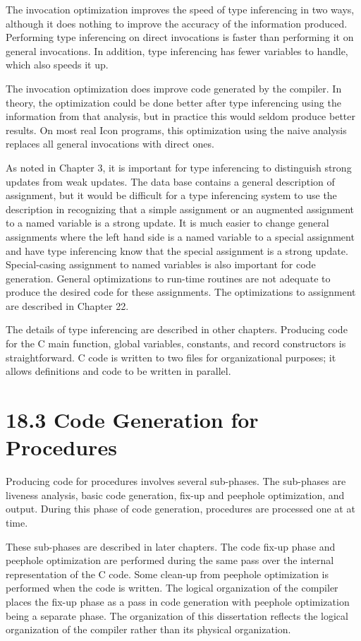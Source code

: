 The invocation optimization improves the speed of type inferencing in
two ways, although it does nothing to improve the accuracy of the
information produced. Performing type inferencing on direct
invocations is faster than performing it on general invocations. In
addition, type inferencing has fewer variables to handle, which also
speeds it up.

The invocation optimization does improve code generated by the
compiler. In theory, the optimization could be done better after type
inferencing using the information from that analysis, but in practice
this would seldom produce better results. On most real Icon programs,
this optimization using the naive analysis replaces all general
invocations with direct ones.

As noted in Chapter 3, it is important for type inferencing to
distinguish strong updates from weak updates. The data base contains a
general description of assignment, but it would be difficult for a
type inferencing system to use the description in recognizing that a
simple assignment or an augmented assignment to a named variable is a
strong update.  It is much easier to change general assignments where
the left hand side is a named variable to a special assignment and
have type inferencing know that the special assignment is a strong
update. Special-casing assignment to named variables is also important
for code generation. General optimizations to run-time routines are
not adequate to produce the desired code for these assignments. The
optimizations to assignment are described in Chapter 22.

The details of type inferencing are described in other
chapters. Producing code for the C main function, global variables,
constants, and record constructors is straightforward. C code is
written to two files for organizational purposes; it allows
definitions and code to be written in parallel.


\section[18.3 Code Generation for Procedures]{18.3 Code Generation for Procedures}

Producing code for procedures involves several sub-phases. The
sub-phases are liveness analysis, basic code generation, fix-up and
peephole optimization, and output. During this phase of code
generation, procedures are processed one at at time.

These sub-phases are described in later chapters. The code fix-up
phase and peephole optimization are performed during the same pass
over the internal representation of the C code. Some clean-up from
peephole optimization is performed when the code is written. The
logical organization of the compiler places the fix-up phase as a pass
in code generation with peephole optimization being a separate
phase. The organization of this dissertation reflects the logical
organization of the compiler rather than its physical organization.

